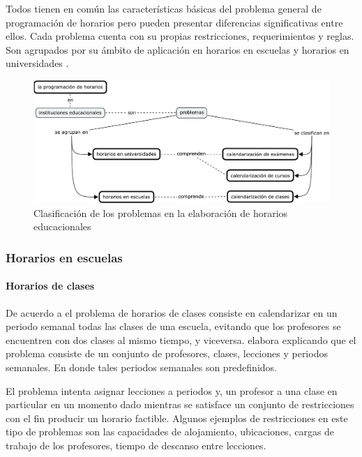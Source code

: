\documentclass[spanish,draft,12pt,headsepline,footsepline,paper=letter]{scrreprt}
\begin{document}
Todos tienen en común las características básicas del problema general de programación de horarios pero pueden presentar diferencias significativas entre ellos. Cada problema cuenta con su propias restricciones, requerimientos y reglas. Son agrupados por su ámbito de aplicación en horarios en escuelas y horarios en universidades \citep[p.~10]{abdullah06heuristic-approaches}.

\begin{figure}[hbtp]
\centering
\includegraphics[width=\textwidth]{timetabling_classification.pdf}
\caption[Clasificación del problema]{Clasificación de los problemas en la elaboración de horarios educacionales}
\label{fig:timetabling_classification}
\end{figure}

\subsubsection{Horarios en escuelas}


\paragraph{Horarios de clases}

De acuerdo a \citet[p.~88]{schaerf99a-survey-of-automated} el problema de horarios de clases consiste en calendarizar en un periodo semanal todas las clases de una escuela, evitando que los profesores se encuentren con dos clases al mismo tiempo, y viceversa. \citet[p.~10,11]{abdullah06heuristic-approaches} elabora explicando que el problema consiste de un conjunto de profesores, clases, lecciones y periodos semanales. En donde tales periodos semanales son predefinidos.

El problema intenta asignar lecciones a periodos y, un profesor a una clase en particular en un momento dado mientras se satisface un conjunto de restricciones con el fin producir un horario factible. Algunos ejemplos de restricciones en este tipo de problemas son las capacidades de alojamiento, ubicaciones, cargas de trabajo de los profesores, tiempo de descanso entre lecciones.
\end{document}
